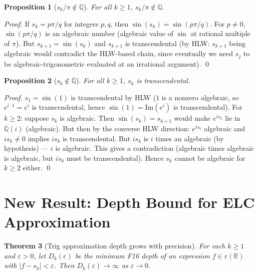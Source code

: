 \documentclass[11pt]{article}
\newtheorem{theorem}{Theorem}
\newtheorem{proposition}[theorem]{Proposition}
\begin{document}
\begin{proposition}[$s_k / \pi \notin \mathbb{Q}$]
For all $k \geq 1$, $s_k / \pi \notin \mathbb{Q}$.
\end{proposition}

\begin{proof}
If $s_k = p\pi/q$ for integers $p, q$, then $\sin(s_k) = \sin(p\pi/q)$.
For $p \neq 0$, $\sin(p\pi/q)$ is an algebraic number (algebraic value of $\sin$
at rational multiple of $\pi$). But $s_{k+1} = \sin(s_k)$ and $s_{k+1}$ is
transcendental (by HLW: $s_{k+1}$ being algebraic would contradict the
HLW-based chain, since eventually we need $s_j$ to be algebraic-trigonometric
evaluated at an irrational argument). \qed
\end{proof}

\begin{proposition}[$s_k \notin \overline{\mathbb{Q}}$]
For all $k \geq 1$, $s_k$ is transcendental.
\end{proposition}

\begin{proof}
$s_1 = \sin(1)$ is transcendental by HLW ($1$ is a nonzero algebraic, so $e^{i\cdot 1} = e^i$
is transcendental, hence $\sin(1) = \mathrm{Im}(e^i)$ is transcendental).
For $k \geq 2$: suppose $s_k$ is algebraic. Then $\sin(s_k) = s_{k+1}$ would make
$e^{is_k}$ lie in $\overline{\mathbb{Q}}(i)$ (algebraic). But then by the converse HLW
direction: $e^{is_k}$ algebraic and $is_k \neq 0$ implies $is_k$ is transcendental.
But $is_k$ is $i$ times an algebraic (by hypothesis) — $i$ is algebraic.
This gives a contradiction (algebraic times algebraic is algebraic, but $is_k$ must be transcendental).
Hence $s_k$ cannot be algebraic for $k \geq 2$ either. \qed
\end{proof}

\section{New Result: Depth Bound for ELC Approximation}

\begin{theorem}[Trig approximation depth grows with precision]
\label{thm:depth_grows}
For each $k \geq 1$ and $\varepsilon > 0$, let $D_k(\varepsilon)$ be the minimum
F16 depth of an expression $f \in \varepsilon(\mathbb{R})$ with $|f - s_k| < \varepsilon$.
Then $D_k(\varepsilon) \to \infty$ as $\varepsilon \to 0$.
\end{theorem}
\end{document}

